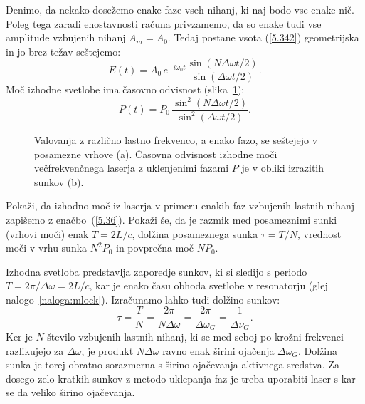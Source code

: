 Denimo, da nekako dosežemo enake faze vseh nihanj, ki naj bodo vse enake nič. 
Poleg tega zaradi enostavnosti
računa privzamemo, da so enake tudi vse amplitude vzbujenih nihanj $A_{m}= A_0$. Tedaj
postane vsota (\ref{5.342}) geometrijska in jo brez težav seštejemo:
\begin{equation}
E(t)=A_{0}\,e^{-i\omega _{0}t}\frac{\sin (N\Delta \omega t/2)}{\sin(\Delta
\omega t/2)}.
\label{5.352}
\end{equation}
Moč izhodne svetlobe ima časovno odvisnost (slika~\ref{s5.10}):
\begin{equation}
P(t)=P_{0}\,\frac{\sin ^{2}(N\Delta \omega t/2)}{\sin ^{2}(\Delta \omega t/2)}.
\label{5.36}
\end{equation}

\begin{figure}[ht]
\centering
\def\svgwidth{128truemm} 

\caption{Valovanja z različno lastno frekvenco, a enako fazo, se seštejejo v 
posamezne vrhove (a). 
Časovna odvisnost izhodne moči večfrekvenčnega laserja z uklenjenimi fazami $P$ je 
v obliki izrazitih sunkov (b).}
\label{s5.10}
\end{figure}

\begin{naloga}
\label{naloga:mlock}
Pokaži, da izhodno moč iz laserja v primeru enakih faz vzbujenih lastnih nihanj
zapišemo z enačbo~(\ref{5.36}). Pokaži še, da je razmik med posameznimi sunki (vrhovi
moči) enak $T=2L/c$, dolžina posameznega sunka $\tau = T/N$, vrednost moči v vrhu 
sunka $N^{2}P_{0}$ in povprečna moč $NP_{0}$.
\end{naloga}

Izhodna svetloba predstavlja zaporedje sunkov, 
ki si sledijo s periodo $T=2\pi /\Delta \omega =2L/c$, kar je enako času obhoda
svetlobe v resonatorju (glej nalogo~\ref{naloga:mlock}).  Izračunamo lahko tudi 
dolžino sunkov:
\begin{equation}
\tau=\frac{T}{N}=\frac{2\pi }{N\Delta \omega }=\frac{2\pi }{\Delta\omega_{G}} = 
\frac{1}{\Delta\nu_{G}}.
\label{5.37}
\end{equation}
Ker je $N$ število vzbujenih lastnih nihanj, ki se med seboj po krožni 
frekvenci razlikujejo za $\Delta \omega$, je produkt $N\Delta \omega$ ravno enak
širini ojačenja $\Delta \omega_{G}$. Dolžina sunka je torej obratno sorazmerna s širino
ojačevanja aktivnega sredstva. Za dosego zelo kratkih sunkov z metodo uklepanja
faz je treba uporabiti laser s kar se da veliko širino ojačevanja. 

